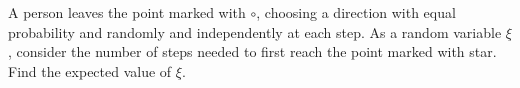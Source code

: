\documentclass{article}
\begin{document}
\begin{enumerate}
\begin{center}
\end{center}

A person leaves the point marked with $\circ$, choosing a direction with 
equal probability and randomly and independently at each step. 
As a random variable $\xi$, consider the number of steps needed 
to first reach the point marked with star. 
Find the expected value of $\xi$.
\end{enumerate}
\end{document}
